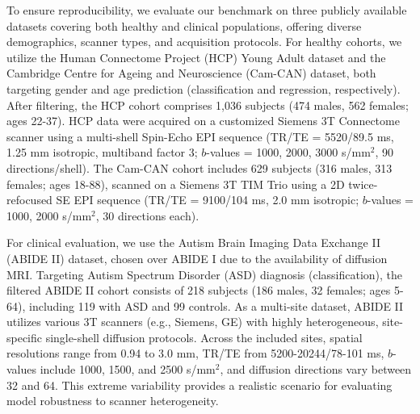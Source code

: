 To ensure reproducibility, we evaluate our benchmark on three publicly available datasets 
covering both healthy and clinical populations, offering diverse demographics, scanner 
types, and acquisition protocols. For healthy cohorts, we utilize the Human Connectome 
Project (HCP) Young Adult dataset and the Cambridge Centre for Ageing and Neuroscience 
(Cam-CAN) dataset, both targeting gender and age prediction (classification and regression, respectively). 
After filtering, the HCP cohort comprises 1,036 subjects (474 males, 562 females; ages 22-37). HCP data were 
acquired on a customized Siemens 3T Connectome scanner using a multi-shell Spin-Echo EPI sequence 
(TR/TE = 5520/89.5 ms, 1.25 mm isotropic, multiband factor 3; $b$-values = 1000, 2000, 3000 
s/mm$^2$, 90 directions/shell). The Cam-CAN cohort includes 629 subjects (316 males, 313 females; 
ages 18-88), scanned on a Siemens 3T TIM Trio using a 2D twice-refocused SE EPI sequence 
(TR/TE = 9100/104 ms, 2.0 mm isotropic; $b$-values = 1000, 2000 s/mm$^2$, 30 directions each). 

For clinical evaluation, we use the Autism Brain Imaging Data Exchange II (ABIDE II) dataset, 
chosen over ABIDE I due to the availability of diffusion MRI. Targeting Autism Spectrum Disorder 
(ASD) diagnosis (classification), the filtered ABIDE II cohort consists of 218 subjects 
(186 males, 32 females; ages 5-64), including 119 with ASD and 99 controls. As a multi-site dataset, 
ABIDE II utilizes various 3T scanners (e.g., Siemens, GE) 
with highly heterogeneous, site-specific single-shell diffusion protocols. Across the included sites, 
spatial resolutions range from 0.94 to 3.0 mm, TR/TE from 5200-20244/78-101 ms, $b$-values include 
1000, 1500, and 2500 s/mm$^2$, and diffusion directions vary between 32 and 64. This extreme variability 
provides a realistic scenario for evaluating model robustness to scanner heterogeneity.


